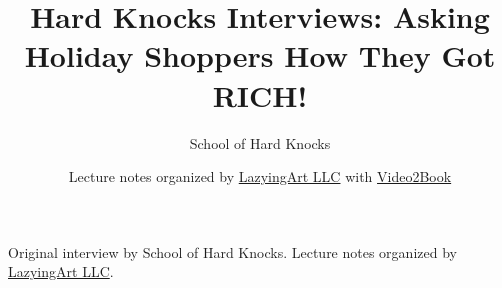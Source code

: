 \documentclass[11pt,oneside]{book}
\begin{document}
\frontmatter
\title{Hard Knocks Interviews: Asking Holiday Shoppers How They Got RICH!}
\author{School of Hard Knocks}
\date{Lecture notes organized by \href{https://lazying.art}{LazyingArt LLC} with \href{https://github.com/lachlanchen/Video2Book}{Video2Book}}
\maketitle
\begin{center}
\small Original interview by School of Hard Knocks. Lecture notes organized by \href{https://lazying.art}{LazyingArt LLC}.
\end{center}
\clearpage
\mainmatter

\end{document}
